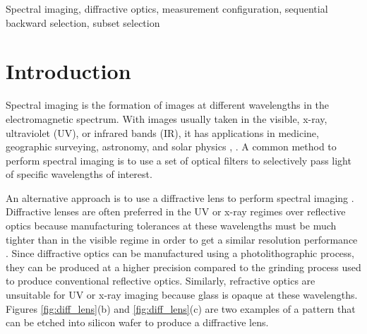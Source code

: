 \documentclass{article}
\begin{document}
\begin{keywords}
Spectral imaging, diffractive optics, measurement configuration, sequential
backward selection, subset selection
\end{keywords}

\section{Introduction}
\label{sec:intro}
Spectral imaging is the formation of images at different wavelengths in the
electromagnetic spectrum.  With images usually taken in the visible, x-ray,
ultraviolet (UV), or infrared bands (IR), it has applications in medicine,
geographic surveying, astronomy, and solar physics \cite{shaw2003spectral},
\cite{garini2006spectral}. A common method to perform spectral imaging is to use
a set of optical filters to selectively pass light of specific wavelengths of
interest.



An alternative approach is to use a diffractive lens to perform spectral imaging
\cite{oktem2014icip}. Diffractive lenses are often preferred in the UV or x-ray
regimes over reflective optics because manufacturing tolerances at these
wavelengths must be much tighter than in the visible regime in order to get a
similar resolution performance \cite{davila2011high}. Since diffractive optics can
be manufactured using a photolithographic process, they can be produced at a
higher precision compared to the grinding process used to produce conventional
reflective optics. Similarly, refractive optics are unsuitable for UV or x-ray
imaging because glass is opaque at these wavelengths. Figures
\ref{fig:diff_lens}(b) and \ref{fig:diff_lens}(c) are two examples of a pattern
that can be etched into silicon wafer to produce a diffractive lens.
\end{document}
